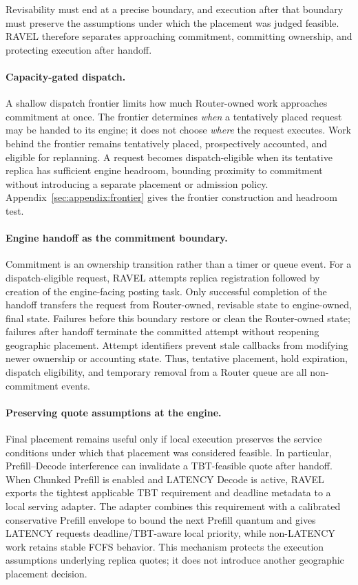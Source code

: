 Revisability must end at a precise boundary, and execution after that boundary
must preserve the assumptions under which the placement was judged feasible.
RAVEL therefore separates approaching commitment, committing ownership, and
protecting execution after handoff.

\paragraph{Capacity-gated dispatch.}
A shallow dispatch frontier limits how much Router-owned work approaches
commitment at once.
The frontier determines \emph{when} a tentatively placed request may be handed
to its engine; it does not choose \emph{where} the request executes.
Work behind the frontier remains tentatively placed, prospectively accounted,
and eligible for replanning.
A request becomes dispatch-eligible when its tentative replica has sufficient
engine headroom, bounding proximity to commitment without introducing a
separate placement or admission policy.
Appendix~\ref{sec:appendix:frontier} gives the frontier construction and
headroom test.

\paragraph{Engine handoff as the commitment boundary.}
Commitment is an ownership transition rather than a timer or queue event.
For a dispatch-eligible request, RAVEL attempts replica registration followed
by creation of the engine-facing posting task.
Only successful completion of the handoff transfers the request from
Router-owned, revisable state to engine-owned, final state.
Failures before this boundary restore or clean the Router-owned state; failures
after handoff terminate the committed attempt without reopening geographic
placement.
Attempt identifiers prevent stale callbacks from modifying newer ownership or
accounting state.
Thus, tentative placement, hold expiration, dispatch eligibility, and temporary
removal from a Router queue are all non-commitment events.

\paragraph{Preserving quote assumptions at the engine.}
Final placement remains useful only if local execution preserves the service
conditions under which that placement was considered feasible.
In particular, Prefill--Decode interference can invalidate a TBT-feasible
quote after handoff.
When Chunked Prefill is enabled and LATENCY Decode is active, RAVEL exports the
tightest applicable TBT requirement and deadline metadata to a local serving
adapter.
The adapter combines this requirement with a calibrated conservative Prefill
envelope to bound the next Prefill quantum and gives LATENCY requests
deadline/TBT-aware local priority, while non-LATENCY work retains stable FCFS
behavior.
This mechanism protects the execution assumptions underlying replica quotes;
it does not introduce another geographic placement decision.

